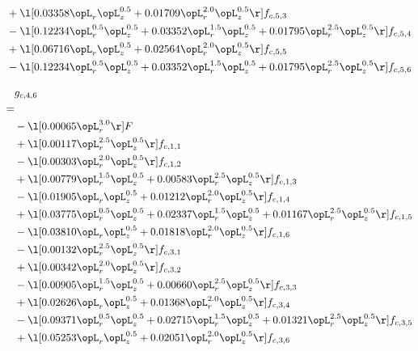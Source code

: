 \begin{alignat}{2}
& + \l[  0.03358 \opL_r \opL_z^{0.5} +  0.01709 \opL_r^{2.0} \opL_z^{0.5}  \r] f_{c,5,3} \nonumber \\ 
& - \l[  0.12234 \opL_r^{0.5} \opL_z^{0.5} +  0.03352 \opL_r^{1.5} \opL_z^{0.5} +  0.01795 \opL_r^{2.5} \opL_z^{0.5}  \r] f_{c,5,4} \nonumber \\ 
& + \l[  0.06716 \opL_r \opL_z^{0.5} +  0.02564 \opL_r^{2.0} \opL_z^{0.5}  \r] f_{c,5,5} \nonumber \\ 
& - \l[  0.12234 \opL_r^{0.5} \opL_z^{0.5} +  0.03352 \opL_r^{1.5} \opL_z^{0.5} +  0.01795 \opL_r^{2.5} \opL_z^{0.5}  \r] f_{c,5,6} \nonumber \\ 
\end{alignat} 


\begin{alignat}{2} 
\label{eq:g_46_0} 
& g_{c,4,6} \nonumber \\ 
 = \\ 
& - \l[  0.00065 \opL_r^{3.0}  \r] F \nonumber \\ 
& + \l[  0.00117 \opL_r^{2.5} \opL_z^{0.5}  \r] f_{c,1,1} \nonumber \\ 
& - \l[  0.00303 \opL_r^{2.0} \opL_z^{0.5}  \r] f_{c,1,2} \nonumber \\ 
& + \l[  0.00779 \opL_r^{1.5} \opL_z^{0.5} +  0.00583 \opL_r^{2.5} \opL_z^{0.5}  \r] f_{c,1,3} \nonumber \\ 
& - \l[  0.01905 \opL_r \opL_z^{0.5} +  0.01212 \opL_r^{2.0} \opL_z^{0.5}  \r] f_{c,1,4} \nonumber \\ 
& + \l[  0.03775 \opL_r^{0.5} \opL_z^{0.5} +  0.02337 \opL_r^{1.5} \opL_z^{0.5} +  0.01167 \opL_r^{2.5} \opL_z^{0.5}  \r] f_{c,1,5} \nonumber \\ 
& - \l[  0.03810 \opL_r \opL_z^{0.5} +  0.01818 \opL_r^{2.0} \opL_z^{0.5}  \r] f_{c,1,6} \nonumber \\ 
& - \l[  0.00132 \opL_r^{2.5} \opL_z^{0.5}  \r] f_{c,3,1} \nonumber \\ 
& + \l[  0.00342 \opL_r^{2.0} \opL_z^{0.5}  \r] f_{c,3,2} \nonumber \\ 
& - \l[  0.00905 \opL_r^{1.5} \opL_z^{0.5} +  0.00660 \opL_r^{2.5} \opL_z^{0.5}  \r] f_{c,3,3} \nonumber \\ 
& + \l[  0.02626 \opL_r \opL_z^{0.5} +  0.01368 \opL_r^{2.0} \opL_z^{0.5}  \r] f_{c,3,4} \nonumber \\ 
& - \l[  0.09371 \opL_r^{0.5} \opL_z^{0.5} +  0.02715 \opL_r^{1.5} \opL_z^{0.5} +  0.01321 \opL_r^{2.5} \opL_z^{0.5}  \r] f_{c,3,5} \nonumber \\ 
& + \l[  0.05253 \opL_r \opL_z^{0.5} +  0.02051 \opL_r^{2.0} \opL_z^{0.5}  \r] f_{c,3,6} \nonumber \\ 

\end{alignat}
